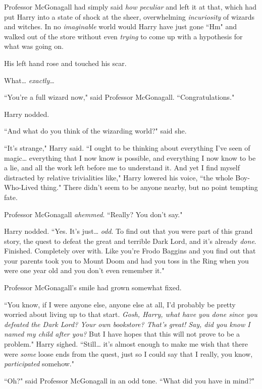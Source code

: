 Professor McGonagall had simply said \emph{how peculiar} and left it at that, which had put Harry into a state of shock at the sheer, overwhelming \emph{incuriosity} of wizards and witches. In no \emph{imaginable} world would Harry have just gone ``Hm" and walked out of the store without even \emph{trying} to come up with a hypothesis for what was going on.

His left hand rose and touched his scar.

What{\ldots} \emph{exactly{\ldots}}

``You're a full wizard now," said Professor McGonagall. ``Congratulations."

Harry nodded.

``And what do you think of the wizarding world?" said she.

``It's strange," Harry said. ``I ought to be thinking about everything I've seen of magic{\ldots} everything that I now know is possible, and everything I now know to be a lie, and all the work left before me to understand it. And yet I find myself distracted by relative trivialities like," Harry lowered his voice, ``the whole Boy-Who-Lived thing." There didn't seem to be anyone nearby, but no point tempting fate.

Professor McGonagall \emph{ahemmed}. ``Really? You don't say."

Harry nodded. ``Yes. It's just{\ldots} \emph{odd}. To find out that you were part of this grand story, the quest to defeat the great and terrible Dark Lord, and it's already \emph{done}. Finished. Completely over with. Like you're Frodo Baggins and you find out that your parents took you to Mount Doom and had you toss in the Ring when you were one year old and you don't even remember it."

Professor McGonagall's smile had grown somewhat fixed.

``You know, if I were anyone else, anyone else at all, I'd probably be pretty worried about living up to that start. \emph{Gosh, Harry, what have you done since you defeated the Dark Lord? Your own bookstore? That's great! Say, did you know I named my child after you?} But I have hopes that this will not prove to be a problem." Harry sighed. ``Still{\ldots} it's almost enough to make me wish that there were \emph{some} loose ends from the quest, just so I could say that I really, you know, \emph{participated} somehow."

``Oh?" said Professor McGonagall in an odd tone. ``What did you have in mind?"

